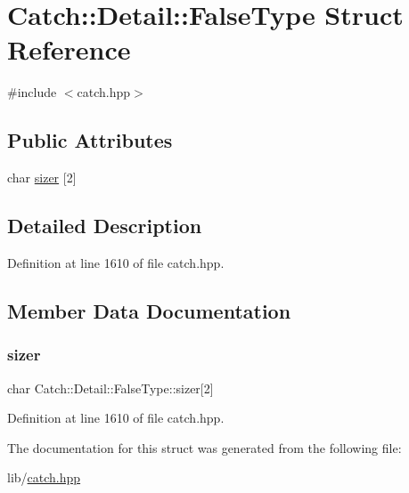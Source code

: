\hypertarget{struct_catch_1_1_detail_1_1_false_type}{}\section{Catch\+:\+:Detail\+:\+:False\+Type Struct Reference}
\label{struct_catch_1_1_detail_1_1_false_type}


{\ttfamily \#include $<$catch.\+hpp$>$}

\subsection*{Public Attributes}
\begin{DoxyCompactItemize}
\item 
char \hyperlink{struct_catch_1_1_detail_1_1_false_type_abc1a730e197d6f7750ae8aaf47b63477}{sizer} \mbox{[}2\mbox{]}
\end{DoxyCompactItemize}


\subsection{Detailed Description}


Definition at line 1610 of file catch.\+hpp.



\subsection{Member Data Documentation}
\hypertarget{struct_catch_1_1_detail_1_1_false_type_abc1a730e197d6f7750ae8aaf47b63477}{}\label{struct_catch_1_1_detail_1_1_false_type_abc1a730e197d6f7750ae8aaf47b63477} 
\subsubsection{\texorpdfstring{sizer}{sizer}}
{\footnotesize\ttfamily char Catch\+::\+Detail\+::\+False\+Type\+::sizer\mbox{[}2\mbox{]}}



Definition at line 1610 of file catch.\+hpp.



The documentation for this struct was generated from the following file\+:\begin{DoxyCompactItemize}
\item 
lib/\hyperlink{catch_8hpp}{catch.\+hpp}\end{DoxyCompactItemize}
